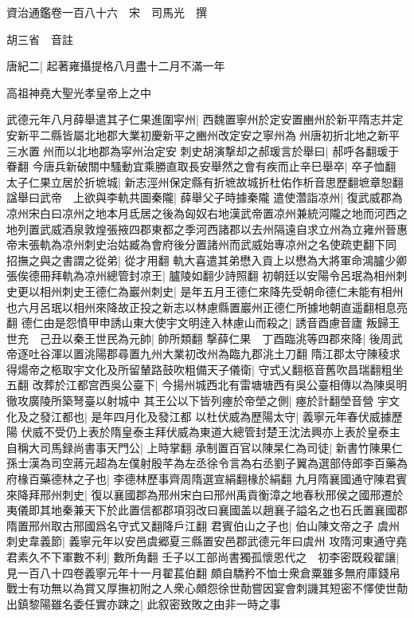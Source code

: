 資治通鑑卷一百八十六　宋　司馬光　撰

胡三省　音註

唐紀二|{
	起著雍攝提格八月盡十二月不滿一年}


高祖神堯大聖光孝皇帝上之中

武德元年八月薛舉遣其子仁果進圍寜州|{
	西魏置寧州於定安置豳州於新平隋志并定安新平二縣皆屬北地郡大業初慶新平之豳州改定安之寧州為州唐初折北地之新平三水置州而以北地郡為寜州治定安}
刺史胡演撃却之郝瑗言於舉曰|{
	郝呼各翻瑗于眷翻}
今唐兵新破關中騷動宜乘勝直取長安舉然之會有疾而止辛巳舉卒|{
	卒子恤翻}
太子仁果立居於折墌城|{
	新志涇州保定縣有折墌故城折杜佑作析音思歷翻墌章恕翻}
諡舉曰武帝　上欲與李軌共圖秦隴|{
	薛舉父子時據秦隴}
遣使濳詣凉州|{
	復武威郡為凉州宋白曰凉州之地本月氐居之後為匈奴右地漢武帝置凉州兼統河隴之地而河西之地列置武威酒泉敦煌張掖四郡東都之季河西諸郡以去州隔遠自求立州為立雍州晉惠帝末張軌為凉州刺史治姑臧為會府後分置諸州而武威始專凉州之名使疏吏翻下同}
招撫之與之書謂之從弟|{
	從才用翻}
軌大喜遣其弟懋入貢上以懋為大將軍命鴻臚少卿張俟德冊拜軌為凉州總管封凉王|{
	臚陵如翻少詩照翻}
初朝廷以安陽令呂珉為相州刺史更以相州刺史王德仁為巖州刺史|{
	是年五月王德仁來降先受朝命德仁未能有相州也六月呂珉以相州來降故正投之新志以林慮縣置巖州正德仁所據地朝直遥翻相息亮翻}
德仁由是怨憤甲申誘山東大使宇文明逹入林慮山而殺之|{
	誘音酉慮音廬}
叛歸王世充　己丑以秦王世民為元帥|{
	帥所類翻}
撃薛仁果　丁酉臨洮等四郡來降|{
	後周武帝逐吐谷渾以置洮陽郡尋置九州大業初改州為臨九郡洮土刀翻}
隋江郡太守陳稜求得煬帝之柩取宇文化及所留輦路鼓吹粗備天子儀衛|{
	守式乂翻柩音舊吹昌瑞翻粗坐五翻}
改葬於江都宫西吳公臺下|{
	今揚州城西北有雷塘塘西有吳公臺相傳以為陳吳明徹攻廣陵所築弩臺以射城中}
其王公以下皆列瘞於帝塋之側|{
	瘞於計翻塋音營}
宇文化及之發江都也|{
	是年四月化及發江都}
以杜伏威為歷陽太守|{
	義寧元年春伏威據歷陽}
伏威不受仍上表於隋皇泰主拜伏威為東道大總管封楚王沈法興亦上表於皇泰主自稱大司馬録尚書事天門公|{
	上時掌翻}
承制置百官以陳杲仁為司徒|{
	新書竹陳果仁}
孫士漢為司空蔣元超為左僕射殷芊為左丞徐令言為右丞劉子翼為選部侍郎李百藥為府椽百藥德林之子也|{
	李德林歷事齊周隋選宣絹翻椽於絹翻}
九月隋襄國通守陳君賓來降拜邢州刺史|{
	復以襄國郡為邢州宋白曰邢州禹貢衡漳之地春秋邢侯之國邢遷於夷儀即其地秦兼天下於此置信都郡項羽改曰襄國盖以趙襄子謚名之也石氏置襄國郡隋置邢州取古邢國爲名守式又翻降戶江翻}
君賓伯山之子也|{
	伯山陳文帝之子}
虞州刺史韋義節|{
	義寧元年以安邑虞郷夏三縣置安邑郡武德元年曰虞州}
攻隋河東通守堯君素久不下軍數不利|{
	數所角翻}
壬子以工部尚書獨孤懷恩代之　初李密既殺翟讓|{
	見一百八十四卷義寧元年十一月翟萇伯翻}
頗自驕矜不恤士衆倉粟雖多無府庫錢帛戰士有功無以為賞又厚撫初附之人衆心頗怨徐世勣嘗因宴會刺譏其短密不懌使世勣出鎮黎陽雖名委任實亦踈之|{
	此叙密致敗之由非一時之事}
